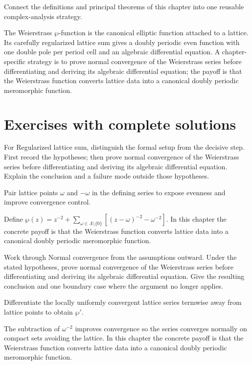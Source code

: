 \begin{problem}\label{prob:iv29-problem-12}
Connect the definitions and principal theorems of this chapter into one reusable complex-analysis strategy.
\end{problem}
\begin{solution}
The Weierstrass $\wp$-function is the canonical elliptic function attached to a lattice. Its carefully regularized lattice sum gives a doubly periodic even function with one double pole per period cell and an algebraic differential equation. A chapter-specific strategy is to prove normal convergence of the Weierstrass series before differentiating and deriving its algebraic differential equation; the payoff is that the Weierstrass function converts lattice data into a canonical doubly periodic meromorphic function.
\end{solution}

\section{Exercises with complete solutions}

\begin{exercise}\label{exr:iv29-01}
For Regularized lattice sum, distinguish the formal setup from the decisive step. First record the hypotheses; then prove normal convergence of the Weierstrass series before differentiating and deriving its algebraic differential equation. Explain the conclusion and a failure mode outside those hypotheses.
\end{exercise}
\begin{hint}
Pair lattice points \(\omega\) and \(-\omega\) in the defining series to expose evenness and improve convergence control.
\end{hint}
\begin{solution}
Define $\wp(z)=z^{-2}+\sum_{\omega\in\Lambda\setminus\{0\}}[(z-\omega)^{-2}-\omega^{-2}]$. In this chapter the concrete payoff is that the Weierstrass function converts lattice data into a canonical doubly periodic meromorphic function.
\end{solution}

\begin{exercise}\label{exr:iv29-02}
Work through Normal convergence from the assumptions outward. Under the stated hypotheses, prove normal convergence of the Weierstrass series before differentiating and deriving its algebraic differential equation. Give the resulting conclusion and one boundary case where the argument no longer applies.
\end{exercise}
\begin{hint}
Differentiate the locally uniformly convergent lattice series termwise away from lattice points to obtain \(\wp'\).
\end{hint}
\begin{solution}
The subtraction of $\omega^{-2}$ improves convergence so the series converges normally on compact sets avoiding the lattice. In this chapter the concrete payoff is that the Weierstrass function converts lattice data into a canonical doubly periodic meromorphic function.
\end{solution}

